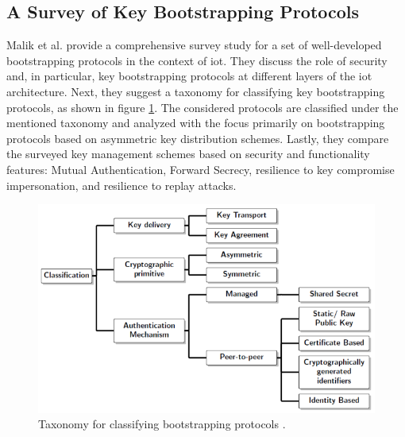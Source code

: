 \subsection{A Survey of Key Bootstrapping Protocols}
Malik et al. \cite{bs-survey} provide a comprehensive survey study for a set of well-developed bootstrapping protocols in the context of \gls{iot}. They discuss the role of security and, in particular, key bootstrapping protocols at different layers of the \gls{iot} architecture. Next, they suggest a taxonomy for classifying key bootstrapping protocols, as shown in figure \ref{fig:bs-taxonomy}. The considered protocols are classified under the mentioned taxonomy and analyzed with the focus primarily on bootstrapping protocols based on asymmetric key distribution schemes. Lastly, they compare the surveyed key management schemes based on security and functionality features: Mutual Authentication, Forward Secrecy, resilience to key compromise impersonation, and resilience to replay attacks.
\begin{figure}[hptb]
	\centering
	\includegraphics[scale=0.5]{Images/taxonomy.png}
	\caption{Taxonomy for classifying bootstrapping protocols \cite{bs-survey}.}
	\label{fig:bs-taxonomy}
\end{figure}

